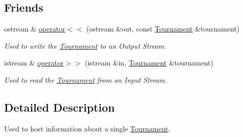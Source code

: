\subsection*{Friends}
\begin{DoxyCompactItemize}
\item 
ostream \& \hyperlink{class_tournament_a732b99f4a91ce76bb3db57cffd96f441}{operator$<$$<$} (ostream \&out, const \hyperlink{class_tournament}{Tournament} \&tournament)
\begin{DoxyCompactList}\small\item\em Used to write the \hyperlink{class_tournament}{Tournament} to an Output Stream. \end{DoxyCompactList}\item 
istream \& \hyperlink{class_tournament_a35e43e0ee6981515ba4442efa8cac7a7}{operator$>$$>$} (istream \&in, \hyperlink{class_tournament}{Tournament} \&tournament)
\begin{DoxyCompactList}\small\item\em Used to read the \hyperlink{class_tournament}{Tournament} from an Input Stream. \end{DoxyCompactList}\end{DoxyCompactItemize}


\subsection{Detailed Description}
Used to host information about a single \hyperlink{class_tournament}{Tournament}. 

